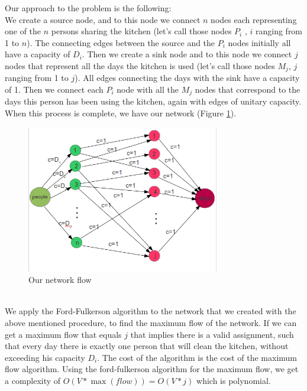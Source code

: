 Our approach to the problem is the following: \\ 
We create a source node, and to this node we connect $n$ nodes each representing one of the $n$ persons sharing the kitchen (let's call those nodes $P_i$ , $i$ ranging from 1 to $n$). The connecting edges between the source and the $P_i$ nodes initially all have a capacity of $D_i$. Then we create a sink node and to this node we connect $j$ nodes that represent all the days the kitchen is used (let's call those nodes $M_j$, $j$ ranging from 1 to $j$). All edges connecting the days with the sink have a capacity of 1. Then we connect each $P_i$ node with all the $M_j$ nodes that correspond to the days this person has been using the kitchen, again with edges of unitary capacity. When this process is complete, we have our network (Figure \ref{fig:prob2}).\\
\begin{figure}[ht]
\centering
\includegraphics[width=0.75\textwidth]{prob2}
\caption{Our network flow}
\label{fig:prob2}
\end{figure}
\\ 

We apply the Ford-Fulkerson algorithm to the network that we created with the above mentioned procedure, to find the maximum flow of the network. If we can get a maximum flow that equals $j$ that implies there is a valid assignment, such that every day there is exactly one person that will clean the kitchen, without exceeding his capacity $D_i$. The cost of the algorithm is the cost of the maximum flow algorithm. Using the ford-fulkerson algorithm for the maximum flow, we get a complexity of $O(V * \max (flow)) = O(V * j)$ which is polynomial.